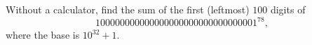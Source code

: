 Without a calculator, find the sum of the first (leftmost) $100$ digits of
\[100000000000000000000000000000001^{78},\]
where the base is $10^{32}+1$.
